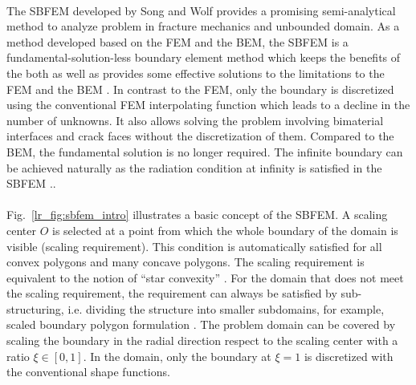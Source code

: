 \paragraph{}
The SBFEM developed by Song and Wolf \citep{Wolf1996} provides a promising semi-analytical method to analyze problem in fracture mechanics and unbounded domain.
As a method developed based on the FEM and the BEM, the SBFEM is a fundamental-solution-less boundary element method which keeps the benefits of the both as well as provides some effective solutions to the limitations to the FEM and the BEM \citep{Wol1999}.
In contrast to the FEM, only the boundary is discretized using the conventional FEM interpolating function which leads to a decline in the number of unknowns.
It also allows solving the problem involving bimaterial interfaces and crack faces without the discretization of them.
Compared to the BEM, the fundamental solution is no longer required.
The infinite boundary can be achieved naturally as the radiation condition at infinity is satisfied in the SBFEM \citep{Wol2003}..

\paragraph{}
Fig.~\ref{lr_fig:sbfem_intro} illustrates a basic concept of the SBFEM.
A scaling center $O$ is selected at a point from which the whole boundary of the domain is visible (scaling requirement).
This condition is automatically satisfied for all convex polygons and many concave polygons.
The scaling requirement is equivalent to the notion of ``star convexity'' \citep{Bishop2014}.
For the domain that does not meet the scaling requirement, the requirement can always be satisfied by sub-structuring, i.e. dividing the structure into smaller subdomains, for example, scaled boundary polygon formulation \citep{NATARAJAN2014101}.
The problem domain can be covered by scaling the boundary in the radial direction respect to the scaling center with a ratio $\xi \in [0,1]$.
In the domain, only the boundary at $\xi=1$ is discretized with the conventional shape functions.

